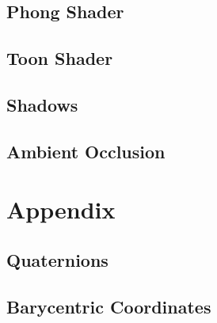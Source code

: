 \documentclass{article}
\begin{document}
\subsection{Phong Shader}
\subsection{Toon Shader}
\subsection{Shadows}
\subsection{Ambient Occlusion}

\section{Appendix}
\subsection{Quaternions}
\subsection{Barycentric Coordinates}
\end{document}
